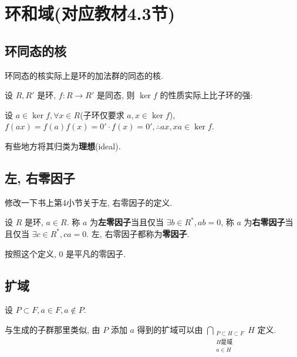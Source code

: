 \documentclass[color=black,device=normal,lang=cn,mode=geye]{elegantnote}
\begin{document}
\section{环和域(对应教材4.3节)}
\subsection{环同态的核}
环同态的核实际上是环的加法群的同态的核.

设 $R,R'$ 是环, $f:R\to R'$ 是同态, 则 $\ker f$ 的性质实际上比子环的强:

设 $a\in\ker f,\forall x\in R$(子环仅要求 $a,x\in\ker f$), $f(ax)=f(a)f(x)=0'\cdot f(x)=0',\therefore ax,xa\in\ker f$.

有些地方将其归类为\textbf{理想}(ideal).
\subsection{左, 右零因子}
修改一下书上第4小节关于左, 右零因子的定义.
\begin{definition}
    设 $R$ 是环, $a\in R$. 称 $a$ 为\textbf{左零因子}当且仅当 $\exists b\in R^*,ab=0$, 称 $a$ 为\textbf{右零因子}当且仅当 $\exists c\in R^*,ca=0$. 左, 右零因子都称为\textbf{零因子}.
\end{definition}

按照这个定义, $0$ 是平凡的零因子.
\subsection{扩域}
设 $P\subset F,a\in F,a\notin P$.

与生成的子群那里类似, 由 $P$ 添加 $a$ 得到的扩域可以由 $\bigcap\limits_{\substack{P\subset H\subset F\\H\text{是域}\\a\in H}}H$ 定义.
\end{document}
